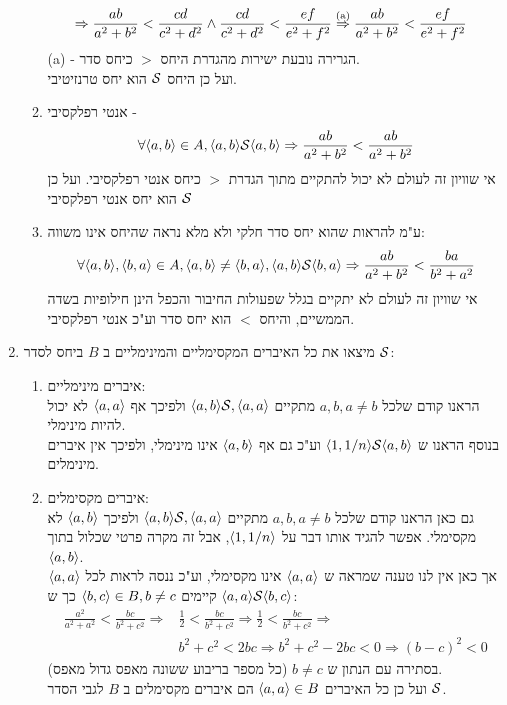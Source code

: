 \documentclass{article}
\begin{document}
\begin{enumerate}
\begin{enumerate}
\begin{align*}
			& \Rightarrow	\frac{ab}{a^2 + b^2} < \frac{cd}{c^2 + d^2} \land
			\frac{cd}{c^2 + d^2} < \frac{ef}{e^2 + f^2} \overset{\text{(a)}}\Rightarrow
			\frac{ab}{a^2 + b^2} < \frac{ef}{e^2 + f^2}
		\end{align*}
		(a) -
		הגרירה נובעת ישירות מהגדרת היחס $>$ כיחס סדר. \\
		ועל כן היחס $\mathcal{S}$ הוא יחס טרנזיטיבי.
		 \item אנטי רפלקסיבי -
		 \[
			\forall \langle a, b \rangle \in A,
			\langle a, b \rangle\mathcal{S}\langle a, b \rangle \Rightarrow \frac{ab}{a^2 + b^2} < \frac{ab}{a^2 + b^2}
		 \]
		 אי שוויון זה לעולם לא יכול להתקיים מתוך הגדרת $>$ כיחס אנטי רפלקסיבי.
		 ועל כן $\mathcal{S}$ הוא יחס אנטי רפלקסיבי
		 \item ע"מ להראות שהוא יחס סדר חלקי ולא מלא נראה שהיחס אינו משווה:
		 \[
			 \forall \langle a,b \rangle, \langle b,a \rangle \in A,
			 \langle a,b \rangle \neq \langle b,a \rangle,
			 \langle a,b \rangle\mathcal{S}\langle b,a \rangle \Rightarrow
			 \frac{ab}{a^2+b^2} < \frac{ba}{b^2+a^2}
		 \]
		 אי שוויון זה לעולם לא יתקיים בגלל שפעולות החיבור והכפל הינן חילופיות בשדה הממשיים, והיחס $<$ הוא יחס סדר וע"כ אנטי רפלקסיבי.
	\end{enumerate}
	\item מיצאו את כל האיברים המקסימליים והמינימליים ב $B$ ביחס לסדר $\mathcal{S}$:
	\begin{enumerate}
		\item איברים מינימליים: \\
		 הראנו קודם שלכל $a, b, a \neq b$ מתקיים $\langle a,b \rangle \mathcal{S}, \langle a,a \rangle$ ולפיכך אף $\langle a,a \rangle$ לא יכול להיות מינימלי. \\
		בנוסף הראנו ש $\langle 1, 1/n \rangle\mathcal{S}\langle a,b \rangle$ וע"כ גם אף $\langle a,b \rangle$ אינו מינימלי, ולפיכך אין איברים מינימלים.
		\item איברים מקסימלים: \\
		גם כאן הראנו קודם  שלכל $a,b, a \neq b$ מתקיים $\langle a,b \rangle \mathcal{S}, \langle a,a \rangle$ ולפיכך $\langle a,b \rangle$ לא מקסימלי.
		אפשר להגיד אותו דבר על $\langle 1, 1/n \rangle$, אבל זה מקרה פרטי שכלול בתוך $\langle a,b \rangle$. \\
		אך כאן אין לנו טענה שמראה ש $\langle a,a \rangle$ אינו מקסימלי, וע"כ ננסה לראות לכל $\langle a,a \rangle$ קיימים $\langle b,c \rangle \in B, b \neq c$ כך ש $\langle a,a \rangle\mathcal{S} \langle b,c \rangle$:
		\begin{align*}
			\frac{a^2}{a^2 + a^2} < \frac{bc}{b^2 + c^2} \Rightarrow
			&\frac{1}{2} < \frac{bc}{b^2 + c^2} \Rightarrow
			\frac{1}{2} < \frac{bc}{b^2 + c^2} \Rightarrow \\
			&b^2 + c^2 < 2bc \Rightarrow
			b^2 + c^2 - 2bc < 0 \Rightarrow
			(b-c)^2 < 0
		\end{align*}
		בסתירה עם הנתון ש $b \neq c$ (כל מספר בריבוע ששונה מאפס גדול מאפס). \\
		ועל כן כל האיברים $\langle a,a \rangle \in B$ הם איברים מקסימלים ב $B$ לגבי הסדר $\mathcal{S}$.
	\end{enumerate}
\end{enumerate}
\end{document}

